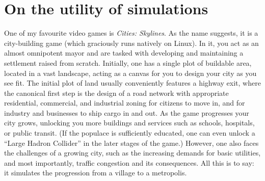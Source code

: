 %
%
%

\section*{On the utility of simulations}
One of my favourite video games is \emph{Cities: Skylines}. As the name
suggests, it is a city-building game (which graciously runs natively on Linux).
In it, you act as an almost omnipotent mayor and are tasked with developing and
maintaining a settlement raised from scratch. Initially, one has a single plot
of buildable area, located in a vast landscape, acting as a canvas for you to
design your city as you see fit. The initial plot of land usually conveniently
features a highway exit, where the canonical first step is the design of a road
network with appropriate residential, commercial, and industrial zoning for
citizens to move in, and for industry and businesses to ship cargo in and out.
As the game progresses your city grows, unlocking you more buildings and services
such as schools, hospitals, or public transit. (If the populace is sufficiently
educated, one can even unlock a \enquote{Large Hadron Collider} in the later
stages of the game.) However, one also faces the challenges of a growing city,
such as the increasing demands for basic utilities, and most importantly,
traffic congestion and its consequences.  All this is to say: it simulates the
progression from a village to a metropolis. 

